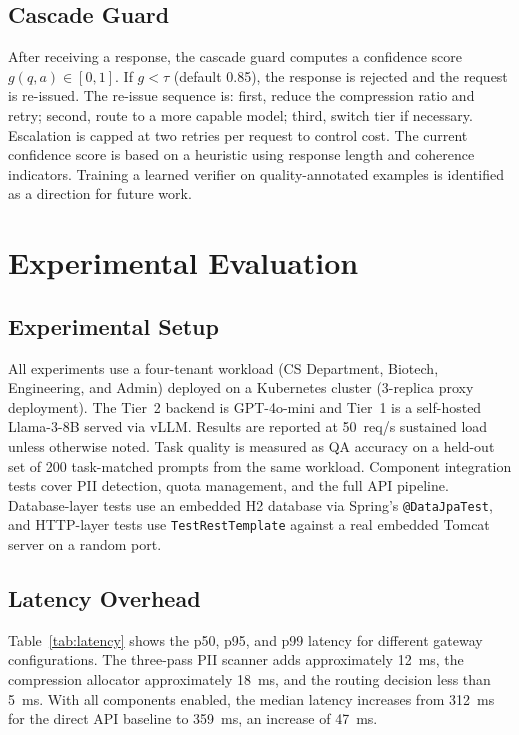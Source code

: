 \documentclass[conference]{IEEEtran}
\begin{document}
\subsection{Cascade Guard}
After receiving a response, the cascade guard computes a confidence score $g(q, a) \in [0, 1]$. If $g < \tau$ (default 0.85), the response is rejected and the request is re-issued. The re-issue sequence is: first, reduce the compression ratio and retry; second, route to a more capable model; third, switch tier if necessary. Escalation is capped at two retries per request to control cost. The current confidence score is based on a heuristic using response length and coherence indicators. Training a learned verifier on quality-annotated examples is identified as a direction for future work.

\section{Experimental Evaluation}

\subsection{Experimental Setup}
All experiments use a four-tenant workload (CS Department, Biotech, Engineering, and Admin) deployed on a Kubernetes cluster (3-replica proxy deployment). The Tier~2 backend is GPT-4o-mini and Tier~1 is a self-hosted Llama-3-8B served via vLLM. Results are reported at 50~req/s sustained load unless otherwise noted. Task quality is measured as QA accuracy on a held-out set of 200 task-matched prompts from the same workload. Component integration tests cover PII detection, quota management, and the full API pipeline. Database-layer tests use an embedded H2 database via Spring's \texttt{@DataJpaTest}, and HTTP-layer tests use \texttt{TestRestTemplate} against a real embedded Tomcat server on a random port.

\subsection{Latency Overhead}
Table~\ref{tab:latency} shows the p50, p95, and p99 latency for different gateway configurations. The three-pass PII scanner adds approximately 12~ms, the compression allocator approximately 18~ms, and the routing decision less than 5~ms. With all components enabled, the median latency increases from 312~ms for the direct API baseline to 359~ms, an increase of 47~ms.
\end{document}
